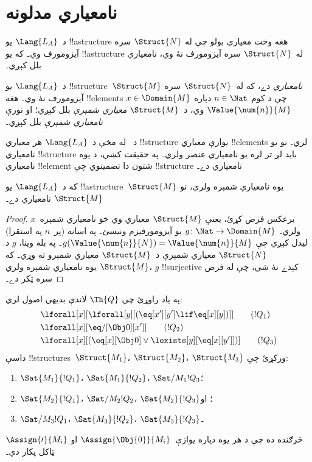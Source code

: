 \documentclass[../../../include/open-logic-section]{subfiles}
\begin{document}
\section{نامعياري مدلونه}

\begin{explain}
د~$\Lang{L_A}$ يو !!a{structure} هغه وخت معياري بولو چې له
$\Struct{N}$ سره آيزومورف وي۔ که يو !!a{structure} له~$\Struct{N}$
سره آيزومورف نۀ وي، نامعياري بلل کېږي۔
\end{explain}

\begin{defn}
د~$\Lang{L_A}$ يو !!{structure}~$\Struct{M}$ \emph{نامعياري} دے،
که له~$\Struct{N}$ سره آيزومورف نۀ وي۔ هغه !!{element}s
$x \in \Domain{M}$ چې د کوم $n \in \Nat$ دپاره
$\Value{\num{n}}{M}$ وي، د~$\Struct{M}$ \emph{معياري شمېرې} بلل
کېږي؛ او نورې \emph{نامعياري شمېرې} بلل کېږي۔
\end{defn}

\begin{explain}
د~ له مخې د~$\Lang{L_A}$ هر
معياري !!{structure} يوازې معياري !!{element}s لري۔ نو يو نامعياري
!!{structure} بايد لږ تر لږه يو نامعياري عنصر ولري۔ په حقيقت کښې،
د يوه نامعياري !!{element} شتون دا تضمينوي چې !!{structure}
نامعياري دے۔
\end{explain}

\begin{prop}
که د~$\Lang{L_A}$ يو !!a{structure}~$\Struct{M}$ يوه نامعياري شمېره
ولري، نو $\Struct{M}$ نامعياري دے۔
\end{prop}

\begin{proof}
برعکس فرض کړئ، يعنې $\Struct{M}$ معياري وي خو نامعياري شمېره~$x$
ولري۔ $g\colon \Nat \to \Domain{M}$ يو آيزومورفيزم ونيسئ۔ په
اسانه (پر~$n$ په استقرا) ليدل کېږي چې
$g(\Value{\num{n}}{N}) = \Value{\num{n}}{M}$۔ په بله وينا، $g$ د
$\Struct{N}$ معياري شمېرې د~$\Struct{M}$ معياري شمېرو ته وړي۔ که
$\Struct{M}$ يوه نامعياري شمېره ولري، $g$ !!{surjective} کېدے نۀ
شي، چې له فرض سره ټکر دے۔
\end{proof}

\begin{prob}
په ياد راوړئ چې $\Th{Q}$ لاندې بديهي اصول لري:
\begin{align*}
& \lforall[x][\lforall[y][(\eq[x'][y'] \lif \eq[x][y])]] \tag{$!Q_1$}\\
& \lforall[x][\eq/[\Obj 0][x']] \tag{$!Q_2$}\\
& \lforall[x][(\eq[x][\Obj 0] \lor \lexists[y][\eq[x][y']])] \tag{$!Q_3$}
\end{align*}
داسې !!{structure}s~$\Struct{M_1}$، $\Struct{M_2}$، $\Struct{M_3}$
ورکړئ چې:
\begin{enumerate}
\item $\Sat{M_1}{!Q_1}$، $\Sat{M_1}{!Q_2}$، $\Sat/{M_1}{!Q_3}$؛
\item $\Sat{M_2}{!Q_1}$، $\Sat/{M_2}{!Q_2}$، $\Sat{M_2}{!Q_3}$؛ او
\item $\Sat/{M_3}{!Q_1}$، $\Sat{M_3}{!Q_2}$، $\Sat{M_3}{!Q_3}$۔
\end{enumerate}
څرګنده ده چې د هر يوه دپاره يوازې~$\Assign{\Obj{0}}{M_i}$ او
$\Assign{\prime}{M_i}$ ټاکل پکار دي۔
\end{prob}
\end{document}
